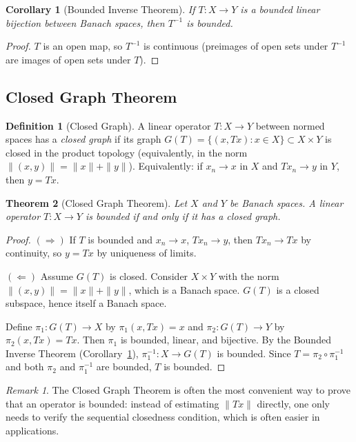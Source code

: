 \documentclass[11pt,a4paper]{article}
\theoremstyle{definition}
\newtheorem{definition}{Definition}[section]
\theoremstyle{plain}
\newtheorem{theorem}{Theorem}[section]
\newtheorem{corollary}[theorem]{Corollary}
\theoremstyle{remark}
\newtheorem{remark}{Remark}[section]
\begin{document}
\begin{corollary}[Bounded Inverse Theorem]\label{cor:bounded-inverse}
If $T \colon X \to Y$ is a bounded linear bijection between Banach spaces,
then $T^{-1}$ is bounded.
\end{corollary}

\begin{proof}
$T$ is an open map, so $T^{-1}$ is continuous (preimages of open sets under
$T^{-1}$ are images of open sets under $T$).
\end{proof}

\subsection{Closed Graph Theorem}

\begin{definition}[Closed Graph]\label{def:closed-graph}
A linear operator $T \colon X \to Y$ between normed spaces has a
\emph{closed graph} if its graph
$G(T) = \{(x, Tx) : x \in X\} \subset X \times Y$ is closed in the
product topology (equivalently, in the norm $\|(x,y)\| = \|x\| + \|y\|$).
Equivalently: if $x_n \to x$ in $X$ and $Tx_n \to y$ in $Y$, then $y = Tx$.
\end{definition}

\begin{theorem}[Closed Graph Theorem]\label{thm:closed-graph}
Let $X$ and $Y$ be Banach spaces. A linear operator $T \colon X \to Y$ is
bounded if and only if it has a closed graph.
\end{theorem}

\begin{proof}
$(\Rightarrow)$ If $T$ is bounded and $x_n \to x$, $Tx_n \to y$, then
$Tx_n \to Tx$ by continuity, so $y = Tx$ by uniqueness of limits.

$(\Leftarrow)$ Assume $G(T)$ is closed. Consider $X \times Y$ with the norm
$\|(x,y)\| = \|x\| + \|y\|$, which is a Banach space. $G(T)$ is a closed
subspace, hence itself a Banach space.

Define $\pi_1 \colon G(T) \to X$ by $\pi_1(x, Tx) = x$ and
$\pi_2 \colon G(T) \to Y$ by $\pi_2(x, Tx) = Tx$.
Then $\pi_1$ is bounded, linear, and bijective. By the Bounded Inverse
Theorem (Corollary~\ref{cor:bounded-inverse}), $\pi_1^{-1} \colon X \to G(T)$
is bounded. Since $T = \pi_2 \circ \pi_1^{-1}$ and both $\pi_2$ and
$\pi_1^{-1}$ are bounded, $T$ is bounded.
\end{proof}

\begin{remark}\label{rem:closed-graph-usage}
The Closed Graph Theorem is often the most convenient way to prove that
an operator is bounded: instead of estimating $\|Tx\|$ directly, one
only needs to verify the sequential closedness condition, which is often
easier in applications.
\end{remark}
\end{document}
